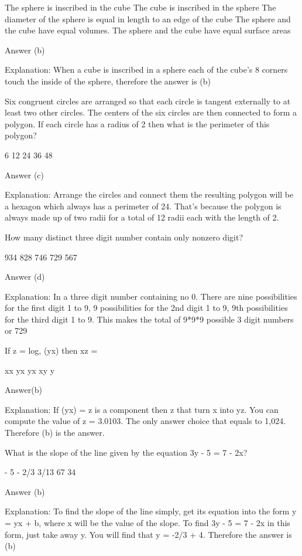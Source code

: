         The sphere is inscribed in the cube
        The cube is inscribed in the sphere
        The diameter of the sphere is equal in length to an edge of the cube
        The sphere and the cube have equal volumes.
        The sphere and the cube have equal surface areas 

    Answer (b)

    Explanation: When a cube is inscribed in a sphere each of the cube's 8 corners touch the inside of the sphere, therefore the answer is (b)

    Six congruent circles are arranged so that each circle is tangent externally to at least two other circles. The centers of the six circles are then connected to form a polygon. If each circle has a radius of 2 then what is the perimeter of this polygon?

        6
        12
        24
        36
        48 

    Answer (c)

    Explanation: Arrange the circles and connect them the resulting polygon will be a hexagon which always has a perimeter of 24. That's because the polygon is always made up of two radii for a total of 12 radii each with the length of 2.

    How many distinct three digit number contain only nonzero digit?

        934
        828
        746
        729
        567 

    Answer (d)

    Explanation: In a three digit number containing no 0. There are nine possibilities for the first digit 1 to 9, 9 possibilities for the 2nd digit 1 to 9, 9th possibilities for the third digit 1 to 9. This makes the total of 9*9*9 possible 3 digit numbers or 729

    If z = log, (yx) then xz =

        xx
        yx
        yx
        xy
        y 

    Answer(b)

    Explanation: If (yx) = z is a component then z that turn x into yz. You can compute the value of z = 3.0103. The only answer choice that equals to 1,024. Therefore (b) is the answer.

    What is the slope of the line given by the equation 3y - 5 = 7 - 2x?

        - 5
        - 2/3
        3/13
        67
        34 

    Answer (b)

    Explanation: To find the slope of the line simply, get its equation into the form y = yx + b, where x will be the value of the slope. To find 3y - 5 = 7 - 2x in this form, just take away y. You will find that y = -2/3 + 4. Therefore the answer is (b) 

